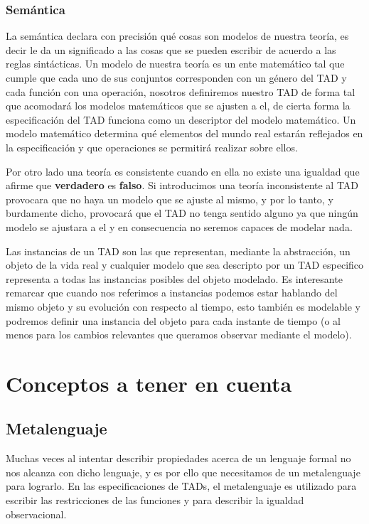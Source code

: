 \subsubsection*{Sem\'antica}

La sem\'antica declara con precisi\'on qu\'e cosas son modelos de nuestra teor\'ia, es decir le da un significado a las cosas que se pueden escribir de acuerdo a las reglas sint\'acticas. Un modelo de nuestra teor\'ia es un ente matem\'atico tal que cumple que cada uno de sus conjuntos corresponden con un g\'enero del TAD y cada funci\'on con una operaci\'on, nosotros definiremos nuestro TAD de forma tal que acomodar\'a los modelos matem\'aticos que se ajusten a el, de cierta forma la especificaci\'on del TAD funciona como un descriptor del modelo matem\'atico. Un modelo matem\'atico determina qu\'e elementos del mundo real estar\'an reflejados en la especificaci\'on y que operaciones se permitir\'a realizar sobre ellos. 

Por otro lado una teor\'ia es consistente cuando en ella no existe una igualdad que afirme que \textbf{verdadero} es \textbf{falso}. Si introducimos una teor\'ia inconsistente al TAD provocara que no haya un modelo que se ajuste al mismo, y por lo tanto, y burdamente dicho, provocar\'a que el TAD no tenga sentido alguno ya que ning\'un modelo se ajustara a el y en consecuencia no seremos capaces de modelar nada.

Las instancias de un TAD son las que representan, mediante la abstracci\'on, un objeto de la vida real y cualquier modelo que sea descripto por un TAD especifico representa a todas las instancias posibles del objeto modelado. Es interesante remarcar que cuando nos referimos a instancias podemos estar hablando del mismo objeto y su evoluci\'on con respecto al tiempo, esto tambi\'en es modelable y podremos definir una instancia del objeto para cada instante de tiempo (o al menos para los cambios relevantes que queramos observar mediante el modelo).

\section{Conceptos a tener en cuenta}
\subsection{Metalenguaje}

Muchas veces al intentar describir propiedades acerca de un lenguaje formal no nos alcanza con dicho lenguaje, y es por ello que necesitamos de un metalenguaje para lograrlo. En las especificaciones de TADs, el metalenguaje es utilizado para escribir las restricciones de las funciones y para describir la igualdad observacional.

